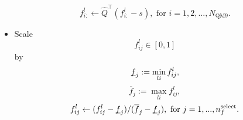 \documentclass[12pt]{article}
\begin{document}
\begin{itemize}
	\begin{equation}
		\label{eq:pca_atom_end}
		f^l_{i:} \leftarrow \hat{Q}^\top(f^l_{i:} - s), \text{ for }i = 1,2,...,N_\text{QM9}.
	\end{equation}
	\item Scale
	\begin{equation}
		\label{eq:scale_1}
		f^l_{ij} \in [0, 1]
	\end{equation}
	by
	\begin{equation}
		\underbar{$f$}_j := \min_{li} f^l_{ij},
	\end{equation}
	\begin{equation}
		\overline{f}_j := \max_{li} f^l_{ij},
	\end{equation}
	\begin{equation}
		f^l_{ij} \leftarrow (f^l_{ij} - \underbar{$f$}_j)/ (\overline{f}_j - \underbar{$f$}_j), \text{ for } j = 1,..., n_f^\text{select}.
	\end{equation}
	
\end{itemize}
	
\end{document}
